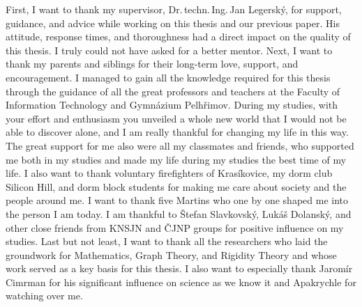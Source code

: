 \documentclass[english,bachelor,unicode,oneside,bw]{ctufit-thesis}
\begin{document}
\frontmatter\frontmatterinit{} %

\thispagestyle{empty}\maketitle\thispagestyle{empty}\cleardoublepage{} %


\imprintpage{} %
\stopTOCentries{} %


\begin{acknowledgmentpage}
	First, I want to thank my supervisor, Dr.\,techn.\,Ing.\,Jan Legerský,
	for support, guidance, and advice while working on this thesis and our previous paper.
	His attitude, response times, and thoroughness had
	a direct impact on the quality of this thesis.
	I truly could not have asked for a better mentor.
	Next, I want to thank my parents and siblings for their
	long-term love, support, and encouragement.
	I managed to gain all the knowledge required for this thesis
	through the guidance of all the great professors
	and teachers at the Faculty of Information Technology and Gymnázium Pelhřimov.
	During my studies, with your effort and enthusiasm
	you unveiled a whole new world
	that I would not be able to discover alone,
	and I am really thankful for changing my life in this way.
	The great support for me also were all my classmates and friends,
	who supported me both in my studies and made my life during my studies
	the best time of my life.
	I also want to thank voluntary firefighters of Krasíkovice, my dorm club
	Silicon Hill, and dorm block students for making me care about society and the people around me.
	I want to thank five Martins who one by one
	shaped me into the person I am today.
	I am thankful to Štefan Slavkovský, Lukáš Dolanský,
	and other close friends from KNSJN and ČJNP groups
	for positive influence on my studies.
	Last but not least, I want to thank all the researchers
	who laid the groundwork for Mathematics, Graph Theory, and Rigidity Theory
	and whose work served as a key basis for this thesis.
	I also want to especially thank Jaromír Cimrman
	for his significant influence on science as we know it
	and Apakrychle for watching over me.
\end{acknowledgmentpage}
\end{document}
